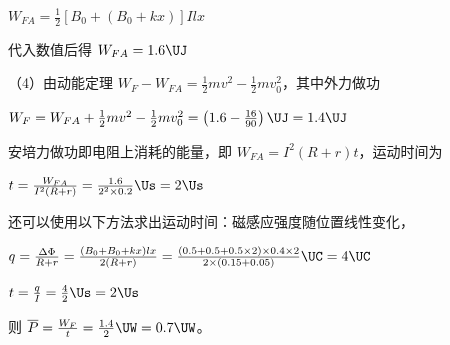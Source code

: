 \documentclass[\gkver]{gaokaozhenti}
\begin{document}
\begin{enumerate}
{$W_{FA}=\frac{1}{2}\left[B_{0}+(B_{0}+kx)\right]Ilx$

代入数值后得 $W_{FA}=1.6\UJ$

（4）由动能定理 $W_{F}-W_{FA}=\frac{1}{2}mv^{2}-\frac{1}{2}mv_{0}^{2}$，其中外力做功

$W_{F}=W_{FA}+\frac{1}{2}mv^{2}-\frac{1}{2}mv_{0}^{2}=\left(1.6-\frac{16}{90}\right)\UJ=1.4\UJ$

安培力做功即电阻上消耗的能量，即 $W_{FA}=I^{2}(R+r)t$，运动时间为

$t=\frac{W_{FA}}{I^{2}(R+r)}=\frac{1.6}{2^{2}\times0.2}\Us=2\Us$

还可以使用以下方法求出运动时间：磁感应强度随位置线性变化，

$q=\frac{\Delta\Phi}{R+r}=\frac{(B_{0}+B_{0}+kx)lx}{2(R+r)}=\frac{(0.5+0.5+0.5\times2)\times0.4\times2}{2\times(0.15+0.05)}\UC=4\UC$

$t=\frac{q}{I}=\frac{4}{2}\Us=2\Us$

则 $\overline{P}=\frac{W_{F}}{t}=\frac{1.4}{2}\UW=0.7\UW$。
}

\end{enumerate}
\end{document}
